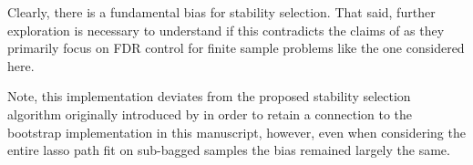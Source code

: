Clearly, there is a fundamental bias for stability selection. That said, further exploration is necessary to understand if this contradicts the claims of \cite{Meinshausen2010} as they primarily focus on FDR control for finite sample problems like the one considered here.

Note, this implementation deviates from the proposed stability selection algorithm originally introduced by \cite{Meinshausen2010} in order to retain a connection to the bootstrap implementation in this manuscript, however, even when considering the entire lasso path fit on sub-bagged samples the bias remained largely the same.
